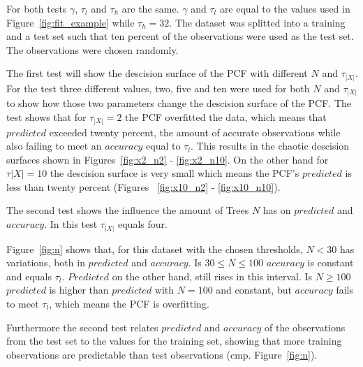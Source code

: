 For both tests $\gamma$, $\tau_l$ and $\tau_h$ are the
same. $\gamma$ and $\tau_l$ are equal to the values used in
Figure~\ref{fig:fit_example} while $\tau_h = 32$. The
dataset was splitted into a training and a test set such
that ten percent of the observations were used as the test
set. The observations were chosen randomly.

The first test will show the descision surface of the PCF
with different $N$ and $\tau_{|X|}$. For the test three
different values, two, five and ten were used for both $N$
and $\tau_{|X|}$ to show how those two parameters change
the descision surface of the PCF. The test shows that for
$\tau_{|X|} = 2$ the PCF overfitted the data, which means
that $predicted$ exceeded twenty percent, the amount of
accurate observations while also failing to meet an
$accuracy$ equal to $\tau_l$. This results in the chaotic
descision surfaces shown in Figures~\ref{fig:x2_n2} -
\ref{fig:x2_n10}. On the other hand for $\tau{|X|} = 10$
the descision surface is very small which means the PCF's
$predicted$ is less than twenty percent (Figures~%
\ref{fig:x10_n2} - \ref{fig:x10_n10}).

The second test shows the influence the amount of Trees $N$
has on $predicted$ and $accuracy$. In this test
$\tau_{|X|}$ equals four.

Figure~\ref{fig:n} shows that, for this dataset with the
chosen thresholds, $N < 30$ has variations, both in
$predicted$ and $accuracy$. Is $30 \leq N \leq 100$
$accuracy$ is constant and equals $\tau_l$. $Predicted$ on
the other hand, still rises in this interval. Is
$N \geq 100$ $predicted$ is higher than $predicted$ with
$N = 100$ and constant, but $accuracy$ fails to meet
$\tau_l$, which means the PCF is overfitting.

Furthermore the second test relates $predicted$ and
$accuracy$ of the observations from the test set to the
values for the training set, showing that more training
observations are predictable than test observations
(cmp. Figure~\ref{fig:n}).






